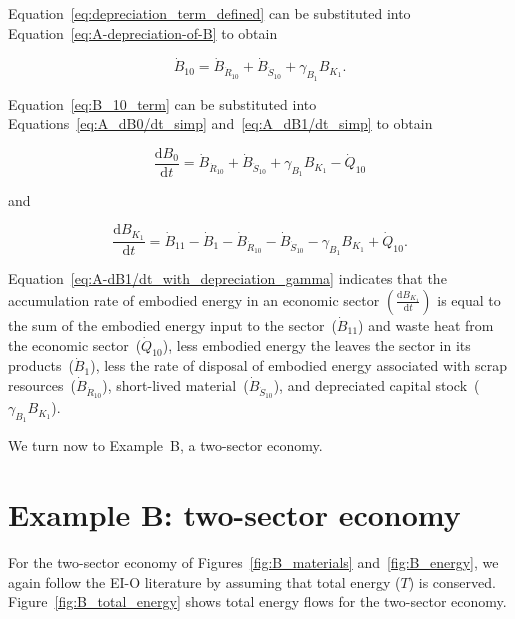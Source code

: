 Equation~\ref{eq:depreciation_term_defined} can be substituted into
Equation~\ref{eq:A-depreciation-of-B} to obtain

\begin{equation} \label{eq:B_10_term}
	\dot{B}_{10}
	= \dot{B}_{\dot{R}_{10}}
	+ \dot{B}_{\dot{S}_{10}}
	+ \gamma_{B_{1}} B_{K_{1}}.	
\end{equation}

\noindent{}Equation~\ref{eq:B_10_term} 
can be substituted into Equations~\ref{eq:A_dB0/dt_simp}
and~\ref{eq:A_dB1/dt_simp} to obtain 

\begin{equation} \label{eq:A-dB0/dt_with_depreciation_gamma}
	\frac{\mathrm{d}B_{0}}{\mathrm{d}t} 
	= \dot{B}_{\dot{R}_{10}}
	+ \dot{B}_{\dot{S}_{10}}
	+ \gamma_{B_{1}} B_{K_{1}}
	- \dot{Q}_{10} 
\end{equation}

\noindent{}and

\begin{equation} \label{eq:A-dB1/dt_with_depreciation_gamma}
	\frac{\mathrm{d}B_{K_{1}}}{\mathrm{d}t} 
	= \dot{B}_{11}
	- \dot{B}_{1}
	- \dot{B}_{\dot{R}_{10}}
	- \dot{B}_{\dot{S}_{10}}
	- \gamma_{B_{1}} B_{K_{1}}
	+ \dot{Q}_{10}.
\end{equation}

\noindent{}Equation~\ref{eq:A-dB1/dt_with_depreciation_gamma} 
indicates that the accumulation rate 
of embodied energy in an economic sector 
$\left( \frac{\mathrm{d}B_{K_{1}}}{\mathrm{d}t} \right)$
is equal to the sum of the embodied energy input to the sector~($\dot{B}_{11}$)
and waste heat from the economic sector~($\dot{Q}_{10}$),
less embodied energy the leaves the sector in its products~($\dot{B}_{1}$), 
less the rate of disposal of embodied energy associated with 
scrap resources~($\dot{B}_{\dot{R}_{10}}$),
short-lived material~($\dot{B}_{\dot{S}_{10}}$), and
depreciated capital stock~($\gamma_{B_{1}} B_{K_{1}}$).

We turn now to Example~B, a two-sector economy.


\section{Example B: two-sector economy} %
\label{sec:Embodied_Energy_Example_B}

For the two-sector economy of Figures~\ref{fig:B_materials}
and~\ref{fig:B_energy}, we again follow the EI-O literature 
by assuming that total energy ($T$) is conserved. 
Figure~\ref{fig:B_total_energy} shows total energy
flows for the two-sector economy.

